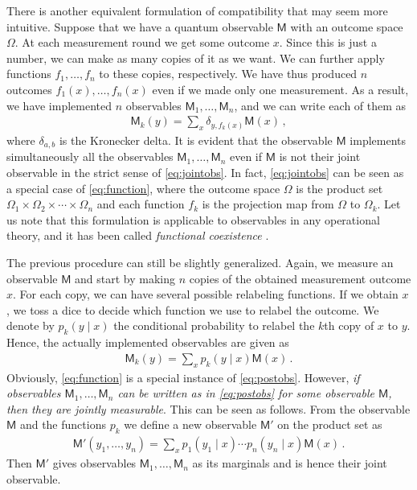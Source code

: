 \documentclass[12pt]{iopart}
\theoremstyle{definition}
\newcommand{\Mo}{\mathsf{M}}%
\begin{document}
There is another equivalent formulation of compatibility that may seem more intuitive. 
Suppose that we have a quantum observable $\Mo$ with an outcome space $\Omega$.
At each measurement round we get some outcome $x$. 
Since this is just a number, we can make as many copies of it as we want. 
We can further apply functions $f_1,\ldots,f_n$ to these copies, respectively.
We have thus produced $n$ outcomes $f_1(x),\ldots,f_n(x)$ even if we made only one measurement.
As a result, we have implemented $n$ observables $\Mo_1,\ldots,\Mo_n$, and we can write each of them as
\begin{align}\label{eq:function}
 \Mo_k(y) = \sum_{x} \delta_{y,f_k(x)}\Mo(x) \, ,
\end{align}
where $\delta_{a,b}$ is the Kronecker delta.
It is evident that the observable $\Mo$ implements simultaneously all the observables $\Mo_1,\ldots,\Mo_n$ even if $\Mo$ is not their joint observable in the strict sense of \eqref{eq:jointobs}.
In fact, \eqref{eq:jointobs} can be seen as a special case of \eqref{eq:function}, where the outcome space $\Omega$ is the product set $\Omega_1\times\Omega_2\times\cdots\times\Omega_n$ and each function $f_k$ is the projection map from $\Omega$ to $\Omega_k$. 
Let us note that this formulation is applicable to observables in any operational theory, and it has been called \emph{functional coexistence} \cite{LaPuYl98}.

The previous procedure can still be slightly generalized.
Again, we measure an observable $\Mo$ and start by making $n$ copies of the obtained measurement outcome $x$.
For each copy, we can have several possible relabeling functions.
If we obtain $x$, we toss a dice to decide which function we use to relabel the outcome.
We denote by $p_k(y\mid x)$ the conditional probability to relabel the $k$th copy of $x$ to $y$.
Hence, the actually implemented observables are given as
\begin{align}\label{eq:postobs}
\Mo_k(y) = \sum_{x} p_k(y \mid x) \Mo(x) \, .
\end{align}
Obviously, \eqref{eq:function} is a special instance of \eqref{eq:postobs}. However, \emph{if observables $\Mo_1, \ldots, \Mo_n$ can be written as in \eqref{eq:postobs} for some observable $\Mo$, then they are jointly measurable}. This can be seen as follows. 
From the observable $\Mo$ and the functions $p_k$ we define a new observable $\Mo'$ on the product set as
\begin{align}\label{eq:post->joint}
\Mo'(y_1,\ldots,y_n) =  \sum_x p_1(y_1 \mid x)\cdots p_n(y_n \mid x) \Mo(x) \, .
\end{align}
Then $\Mo'$ gives observables $\Mo_1, \ldots, \Mo_n$ as its marginals and is hence their joint observable.
\end{document}

